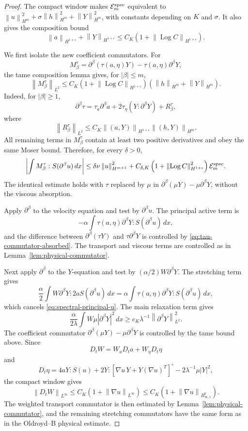 \documentclass[11pt]{article}
\newcommand{\Log}{\operatorname{Log}}
\newcommand{\calE}{\mathcal E}
\newcommand{\eps}{\varepsilon}
\newcommand{\norm}[1]{\left\lVert #1\right\rVert}
\newcommand{\Besov}{B^0_{\infty,1}}
\begin{document}
\begin{proof}
The compact window makes \(\calE_m^{\rm spec}\) equivalent to
\(\norm{u}_{H^m}^2+\sigma\norm{h}_{H^m}^2+\norm{Y}_{H^m}^2\), with constants
depending on \(K\) and \(\sigma\).  It also gives the composition bound
\[
  \norm{a}_{H^{1+\eps}}+\norm{Y}_{H^{1+\eps}}
  \le C_K\left(1+\norm{\Log C}_{H^{1+\eps}}\right).
\]

We first isolate the new coefficient commutators.  For
\[
  M_\beta^\tau=\partial^\beta(\tau(a,\eta)Y)-\tau(a,\eta)\partial^\beta Y,
\]
the tame composition lemma gives, for \(|\beta|\le m\),
\[
  \norm{M_\beta^\tau}_{L^2}
  \le C_K\left(1+\norm{\Log C}_{H^{1+\eps}}\right)
  \left(\norm{h}_{H^m}+\norm{Y}_{H^m}\right).
  \label{eq:tau-commutator-full}
\]
Indeed, for \(|\beta|\ge1\),
\[
  \partial^\beta\tau
  =\tau_a\partial^\beta a
    +2\tau_\eta(Y:\partial^\beta Y)+R_\beta^\tau,
\]
where
\[
  \norm{R_\beta^\tau}_{L^2}
  \le C_K\norm{(a,Y)}_{H^{1+\eps}}\norm{(h,Y)}_{H^m}.
\]
All remaining terms in \(M_\beta^\tau\) contain at least two positive
derivatives and obey the same Moser bound.  Therefore, for every \(\delta>0\),
\[
  \left|\int M_\beta^\tau:S(\partial^\beta u)\,dx\right|
  \le \delta\nu\norm{u}_{H^{m+1}}^2
  +C_{\delta,K}\left(1+\norm{\Log C}_{H^{1+\eps}}^2\right)\calE_m^{\rm spec}.
  \label{eq:tau-commutator-absorbed}
\]
The identical estimate holds with \(\tau\) replaced by \(\mu\) in
\(\partial^\beta(\mu Y)-\mu\partial^\beta Y\), without the viscous absorption.

Apply \(\partial^\beta\) to the velocity equation and test by
\(\partial^\beta u\).  The principal active term is
\[
  -\alpha\int \tau(a,\eta)\partial^\beta Y:S(\partial^\beta u)\,dx,
  \label{eq:spectral-principal-u}
\]
and the difference between \(\partial^\beta(\tau Y)\) and
\(\tau\partial^\beta Y\) is controlled by
\eqref{eq:tau-commutator-absorbed}.  The transport and viscous terms are
controlled as in Lemma~\ref{lem:physical-commutator}.

Next apply \(\partial^\beta\) to the \(Y\)-equation and test by
\((\alpha/2)W\partial^\beta Y\).  The stretching term gives
\[
  \frac{\alpha}{2}\int W\partial^\beta Y:2aS(\partial^\beta u)\,dx
  =
  \alpha\int \tau(a,\eta)\partial^\beta Y:S(\partial^\beta u)\,dx,
\]
which cancels \eqref{eq:spectral-principal-u}.  The main relaxation term gives
\[
  \frac{\alpha}{2\lambda}\int W\mu|\partial^\beta Y|^2\,dx
  \ge c_K\lambda^{-1}\norm{\partial^\beta Y}_{L^2}^2.
\]
The coefficient commutator
\(\partial^\beta(\mu Y)-\mu\partial^\beta Y\) is controlled by the tame bound
above.  Since
\[
  D_tW=W_aD_ta+W_\eta D_t\eta
\]
and
\[
  D_t\eta
  =4aY:S(u)+2Y:[\nabla u\,Y+Y(\nabla u)^T]^\circ
  -2\lambda^{-1}\mu|Y|^2,
\]
the compact window gives
\[
  \norm{D_tW}_{L^\infty}
  \le C_K\left(1+\norm{\nabla u}_{L^\infty}\right)
  \le C_K\left(1+\norm{\nabla u}_{\Besov}\right).
\]
The weighted transport commutator is then estimated by
Lemma~\ref{lem:physical-commutator}, and the remaining stretching commutators
have the same form as in the Oldroyd--B physical estimate.


\end{proof}
\end{document}
